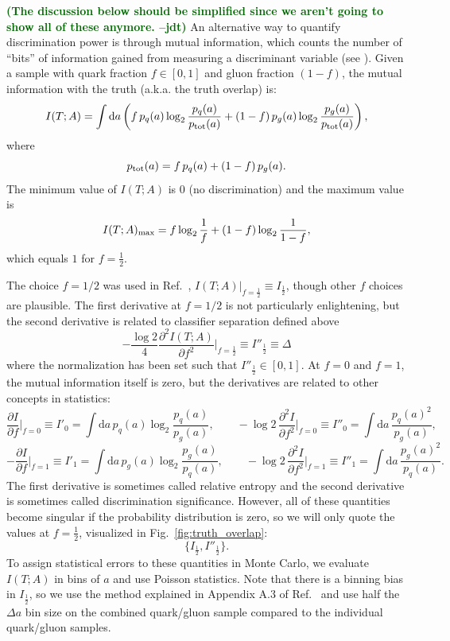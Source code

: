 \documentclass[11pt,letterpaper]{article}
\newcommand{\df}{\text{d}}
\DeclareRobustCommand{\Fig}[1]{Fig.~\ref{#1}}
\DeclareRobustCommand{\Ref}[1]{Ref.~\cite{#1}}
\newcommand{\be}{\begin{equation}}
\newcommand{\ee}{\end{equation}}
\newcommand{\jdt}[1]{\textbf{\textcolor{darkgreen}{(#1 --jdt)}}}
\begin{document}
\jdt{The discussion below should be simplified since we aren't going to show all of these anymore.}  An alternative way to quantify discrimination power is through mutual information, which counts the number of ``bits'' of information gained from measuring a discriminant variable (see \cite{Larkoski:2014pca}).  Given a sample with quark fraction $f \in [0,1]$ and gluon fraction $(1-f)$, the mutual information with the truth (a.k.a. the truth overlap) is:
\be
I(T;A) = \int \df a \left(f \, p_q(a) \log_2 \frac{p_q(a)}{p_{\rm tot}(a)} + (1-f) \, p_g(a) \log_2 \frac{p_g(a)}{p_{\rm tot}(a)}   \right),
\ee
where
\be
p_{\rm tot}(a) = f \, p_q(a) + (1-f) \, p_g(a).
\ee
The minimum value of $I(T;A)$ is $0$ (no discrimination) and the maximum value is
\be
I(T;A)_{\rm max} = f \log_2 \frac{1}{f} + (1-f) \log_2 \frac{1}{1-f},
\ee
which equals $1$ for $f = \frac{1}{2}$.

The choice $f = 1/2$ was used in \Ref{Larkoski:2014pca}, $I(T;A)\big|_{f = \frac{1}{2}} \equiv I_{\frac{1}{2}}$, though other $f$ choices are plausible.  The first derivative at $f = 1/2$ is not particularly enlightening, but the second derivative is related to classifier separation defined above
\be
- \frac{\log 2}{4} \frac{\partial^2 I(T;A)}{\partial f^2} \Big|_{f = \frac{1}{2}} \equiv I''_\frac{1}{2} \equiv \Delta
\ee
where the normalization has been set such that $I''_\frac{1}{2} \in [0,1]$.  At $f = 0$ and $f = 1$, the mutual information itself is zero, but the derivatives are related to other concepts in statistics:
\be
\frac{\partial I}{\partial f} \Big|_{f = 0} \equiv I'_0 = \int \df a \, p_q(a)  \log_2 \frac{p_q(a)}{p_g(a)}, \qquad - \log 2 \,  \frac{\partial^2 I}{\partial f^2} \Big|_{f = 0} \equiv I''_0 = \int \df a \,  \frac{p_q(a)^2}{p_g(a)},
\ee
\be
- \frac{\partial I}{\partial f} \Big|_{f = 1} \equiv I'_1 = \int \df a \, p_g(a) \log_2 \frac{p_g(a)}{p_q(a)}, \qquad - \log 2 \, \frac{\partial^2 I}{\partial f^2} \Big|_{f = 1} \equiv I''_1 = \int \df a \, \frac{p_g(a)^2}{p_q(a)}.
\ee
The first derivative is sometimes called relative entropy and the second derivative is sometimes called discrimination significance.  However, all of these quantities become singular if the probability distribution is zero, so we will only quote the values at $f = \frac{1}{2}$, visualized in \Fig{fig:truth_overlap}:
\be
\{I_\frac{1}{2}, I''_{\frac{1}{2}} \}.
\ee
To assign statistical errors to these quantities in Monte Carlo, we evaluate $I(T;A)$ in bins of $a$ and use Poisson statistics.  Note that there is a binning bias in $I_\frac{1}{2}$, so we use the method explained in Appendix A.3 of \Ref{Larkoski:2014pca} and use half the $\Delta a$ bin size on the combined quark/gluon sample compared to the individual quark/gluon samples.
\end{document}
